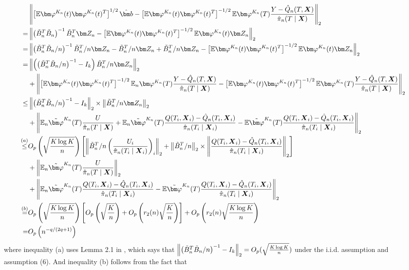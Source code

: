 \begin{equation}\label{eq_appendix:consistency_term1_add2}
    \begin{split}
        &\left\|\left[\E\vpk(t)\vpk(t)^T\right]^{1/2}\hbb-\left[\E\vpk(t)\vpk(t)^T\right]^{-1/2}\E\vpk(T)\frac{Y-\hqn(T,\X)}{\hpin(T\mid\X)}\right\|_2
        \\
        =&\left\|\left(\tbn^T\tbn\right)^{-1}\tbn^T\Zn-\left[\E\vpk(t)\vpk(t)^T\right]^{-1/2}\E\vpk(t)\Zn\right\|_2
        \\
        =&\left\|\left(\tbn^T\tbn/n\right)^{-1}\tbn^T/n\Zn-\tbn^T/n\Zn+\tbn^T/n\Zn-\left[\E\vpk(t)\vpk(t)^T\right]^{-1/2}\E\vpk(t)\Zn\right\|_2
        \\
        =&\left\|\left(\left(\tbn^T\tbn/n\right)^{-1}-I_k\right)\tbn^T/n\Zn\right\|_2
        \\&+\left\|\left[\E\vpk(t)\vpk(t)^T\right]^{-1/2}\E_n\vpk(T)\frac{Y-\hqn(T,\X)}{\hpin(T\mid\X)}-\left[\E\vpk(t)\vpk(t)^T\right]^{-1/2}\E\vpk(T)\frac{Y-\hqn(T,\X)}{\hpin(T\mid\X)}\right\|_2
        \\
        \leq&\left\|\left(\tbn^T\tbn/n\right)^{-1}-I_k\right\|_2\times\left\|\tbn^T/n\Zn\right\|_2
        \\&+\left\|\E_n\tildevpk(T)\frac{U}{\hpin(T\mid\X)}
        +\E_n\tildevpk(T)\frac{Q(T_i,\X_i)-\hqn(T_i,\X_i)}{\hpin(T_i\mid\X_i)}-\E\tildevpk(T)\frac{Q(T_i,\X_i)
        -\hqn(T_i,\X_i)}{\hpin(T_i\mid\X_i)}\right\|_2
        \\
        \stackrel{(a)}{\leq}&\O_p\left(\sqrt{\frac{K\log K}{n}}\right)\left[\left\|\tbn^T/n\left(\frac{U_i}{\hpin(T_i\mid\X_i)}\right)_i\right\|_2
        +\left\|\tbn^T/n\right\|_2\times\left\|\frac{Q(T_i,\X_i)-\hqn(T_i,\X_i)}{\hpin(T_i\mid\X_i)}\right\|_2\right]
        \\&+\left\|\E_n\tildevpk(T)\frac{U}{\hpin(T\mid\X)}\right\|_2
        \\&+\left\|\E_n\tildevpk(T)\frac{Q(T_i,\X_i)-\hqn(T_i,\X_i)}{\hpin(T_i\mid\X_i)}-\E\tildevpk(T)\frac{Q(T_i,\X_i)
        -\hqn(T_i,\X_i)}{\hpin(T_i\mid\X_i)}\right\|_2
        \\
        \stackrel{(b)}{=}&\O_p\left(\sqrt{\frac{K\log K}{n}}\right)\left[\O_p\left(\sqrt{\frac{K}{n}}\right)+\O_p\left(r_2(n)\sqrt{\frac{K}{n}}\right)\right]
        +\O_p\left(r_2(n)\sqrt{\frac{K\log K}{n}}\right)
        \\
        =&\O_p\left(n^{-q/(2q+1)}\right)
    \end{split}
\end{equation}
where inequality (a) uses Lemma 2.1 in \cite{chen2015optimal}, which says that $\left\|\left(\tilde{B}_n^T\tilde{B}_n/n\right)^{-1}-I_k\right\|_2=O_p(\sqrt{\frac{K\log K}{n}})$ under the i.i.d. assumption and  assumption (6). And  inequality (b) follows from the fact that
